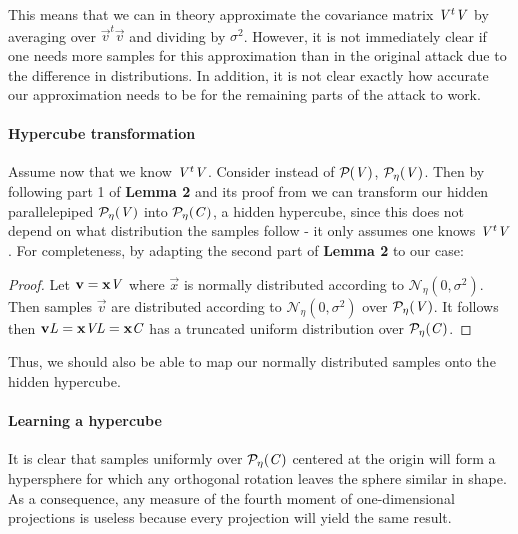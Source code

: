 This means that we can in theory approximate the covariance matrix $\mat{V}^t \mat{V}$ by averaging over $\vec{v}^t \vec{v}$ and dividing by $\sigma ^2$. 
However, it is not immediately clear if one needs more samples for this approximation than in the original attack due to the difference in distributions.
In addition, it is not clear exactly how accurate our approximation needs to be for the remaining parts of the attack to work. 

\paragraph{Hypercube transformation}
Assume now that we know $\mat{V}^t \mat{V}$. Consider instead of $\PP{V}$, $\PP[\eta]{V}$.
Then by following part 1 of \textbf{Lemma 2} and its proof from \cite{NR09} we can transform our hidden parallelepiped $\PP[\eta]{V}$ into $\PP[\eta]{C}$, a hidden hypercube,
since this does not depend on what distribution the samples follow - it only assumes one knows $\mat{V}^t\mat{V}$.
For completeness, by adapting the second part of \textbf{Lemma 2} to our case: 
\begin{proof}
    Let $\vec{v} = \vec{x}\mat{V}$ where $\vec{x}$ is normally distributed according to $\mathcal{N}_{\eta}(0, \sigma^2)$.
    Then samples $\vec{v}$ are distributed according to $\mathcal{N}_{\eta}(0, \sigma^2)$ over $\PP[\eta]{V}$.
    It follows then $\vec{v}\mat{L} = \vec{x}\mat{V}\mat{L} = \vec{x}\mat{C}$ has a truncated uniform distribution over $\PP[\eta]{C}$.
\end{proof}
Thus, we should also be able to map our normally distributed samples onto the hidden hypercube.

\paragraph{Learning a hypercube}
It is clear that samples uniformly over $\PP[\eta]{C}$ centered at the origin will form a hypersphere for which any orthogonal rotation leaves the sphere similar in shape. 
As a consequence, any measure of the fourth moment of one-dimensional projections is useless because every projection will yield the same result.

